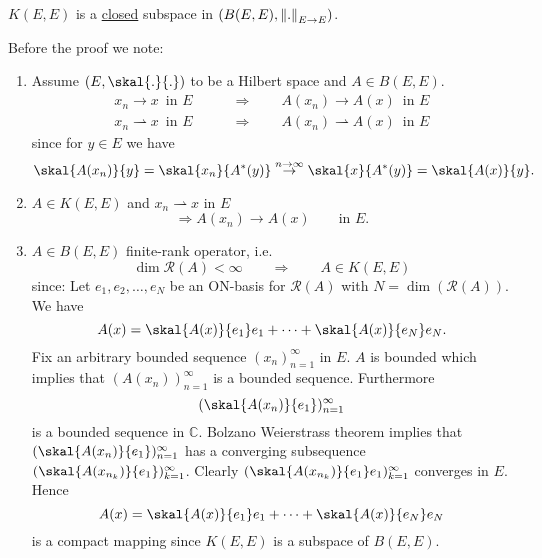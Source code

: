 \begin{proposition}
	$K(E,E)$ is a \underline{closed} subspace in $(B(E,E), \norm{.}_{E \to E})$.
\end{proposition}
Before the proof we note:
\begin{enumerate}
	\item Assume $(E,\skal{.}{.})$ to be a Hilbert space and $A \in B(E,E)$.
	\begin{align*}
		x_n \to x \,\text{ in }E \qquad &\Rightarrow \qquad A(x_n) \to A(x)\, \text{ in }E \\
		x_n \rightharpoonup x \,\text{ in }E \qquad &\Rightarrow \qquad A(x_n) \rightharpoonup A(x)\, \text{ in }E
	\end{align*}
	since for $y \in E$ we have
	\[
		\skal{A(x_n)}{y} = \skal{x_n}{A^*(y)} \stackrel{n \to \infty}{\to } \skal{x}{A^*(y)} = \skal{A(x)}{y}.
	\]
	\item $A \in K(E,E)$ and $x_n \rightharpoonup x$ in $E$ 
	\[
		\Rightarrow A(x_n) \to A(x) \qquad \text{in }E.
	\]
	\item $A \in B(E,E)$ finite-rank operator, i.e.
	\[
		\dim \mathcal{R}(A) < \infty \qquad \Rightarrow \qquad A \in K(E,E)
	\]
	since: Let $e_1,e_2, \dots, e_N$ be an ON-basis for $\mathcal{R}(A)$ with $N = \dim( \mathcal{R}(A))$. We have
	\[
		A(x) = \skal{A(x)}{e_1}e_1 + \dots + \skal{A(x)}{e_N}e_N.
	\]
	Fix an arbitrary bounded sequence $(x_n)_{n=1}^{\infty}$ in $E$. $A$ is bounded which implies that $(A(x_n))_{n=1}^{\infty}$ is a bounded sequence. Furthermore
	\[
		(\skal{A(x_n)}{e_1})_{n=1}^{\infty}
	\]
	is a bounded sequence in $\mathbb{C}$. Bolzano Weierstrass theorem implies that $(\skal{A(x_n)}{e_1})_{n=1}^{\infty}$ has a converging subsequence 
	$(\skal{A(x _{n_k})}{e_1})_{k=1}^{\infty}$. Clearly $(\skal{A(x _{n_k})}{e_1} e_1)_{k=1}^{\infty}$ converges in $E$. \\
	Hence 
	\[
		A(x) = \skal{A(x)}{e_1}e_1 + \dots + \skal{A(x)}{e_N}e_N
	\]
	is a compact mapping since $K(E,E)$ is a subspace of $B(E,E)$.
\end{enumerate}

